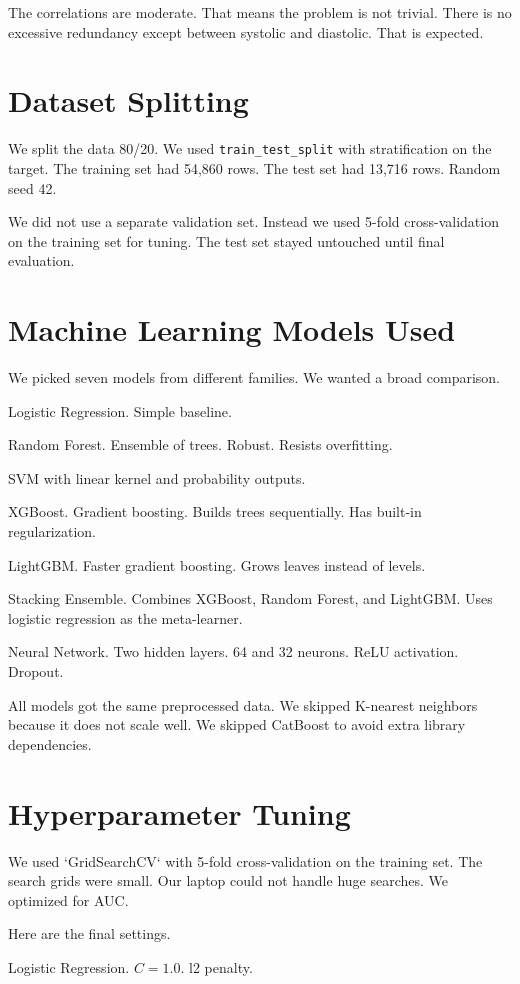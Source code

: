 \documentclass[12pt, a4paper, oneside]{book}
\begin{document}
The correlations are moderate. That means the problem is not trivial. There is no excessive redundancy except between systolic and diastolic. That is expected.

\section{Dataset Splitting}
We split the data 80/20. We used \texttt{train\_test\_split} with stratification on the target. The training set had 54,860 rows. The test set had 13,716 rows. Random seed 42.

We did not use a separate validation set. Instead we used 5-fold cross-validation on the training set for tuning. The test set stayed untouched until final evaluation.

\section{Machine Learning Models Used}
We picked seven models from different families. We wanted a broad comparison.

Logistic Regression. Simple baseline.

Random Forest. Ensemble of trees. Robust. Resists overfitting.

SVM with linear kernel and probability outputs.

XGBoost. Gradient boosting. Builds trees sequentially. Has built-in regularization.

LightGBM. Faster gradient boosting. Grows leaves instead of levels.

Stacking Ensemble. Combines XGBoost, Random Forest, and LightGBM. Uses logistic regression as the meta-learner.

Neural Network. Two hidden layers. 64 and 32 neurons. ReLU activation. Dropout.

All models got the same preprocessed data. We skipped K-nearest neighbors because it does not scale well. We skipped CatBoost to avoid extra library dependencies.

\section{Hyperparameter Tuning}
We used `GridSearchCV` with 5-fold cross-validation on the training set. The search grids were small. Our laptop could not handle huge searches. We optimized for AUC.

Here are the final settings.

Logistic Regression. $C=1.0$. l2 penalty.
\end{document}

